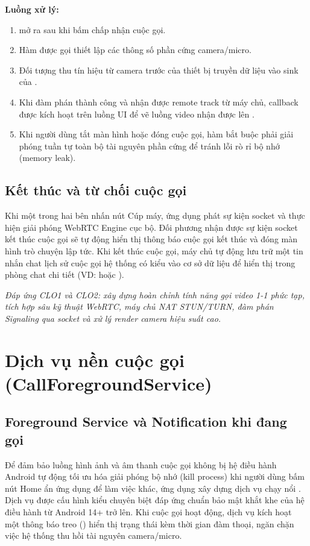 \textbf{Luồng xử lý:}
\begin{enumerate}
    \item {} mở ra sau khi bấm chấp nhận cuộc gọi.
    \item Hàm  được gọi thiết lập các thông số phần cứng camera/micro.
    \item Đối tượng  thu tín hiệu từ camera trước của thiết bị truyền dữ liệu vào sink của .
    \item Khi đàm phán thành công và nhận được remote track từ máy chủ, callback  được kích hoạt trên luồng UI để vẽ luồng video nhận được lên .
    \item Khi người dùng tắt màn hình hoặc đóng cuộc gọi, hàm  bắt buộc phải giải phóng tuần tự toàn bộ tài nguyên phần cứng để tránh lỗi rò rỉ bộ nhớ (memory leak).
\end{enumerate}

\subsection{Kết thúc và từ chối cuộc gọi}
Khi một trong hai bên nhấn nút Cúp máy, ứng dụng phát sự kiện socket  và thực hiện giải phóng WebRTC Engine cục bộ.
Đối phương nhận được sự kiện socket kết thúc cuộc gọi sẽ tự động hiển thị thông báo cuộc gọi kết thúc và đóng màn hình trò chuyện lập tức. Khi kết thúc cuộc gọi, máy chủ tự động lưu trữ một tin nhắn chat lịch sử cuộc gọi hệ thống có kiểu  vào cơ sở dữ liệu để hiển thị trong phòng chat chi tiết (VD:  hoặc ).

\textit{Đáp ứng CLO1 và CLO2: xây dựng hoàn chỉnh tính năng gọi video 1-1 phức tạp, tích hợp sâu kỹ thuật WebRTC, máy chủ NAT STUN/TURN, đàm phán Signaling qua socket và xử lý render camera hiệu suất cao.}


\section{Dịch vụ nền cuộc gọi (CallForegroundService)}

\subsection{Foreground Service và Notification khi đang gọi}
Để đảm bảo luồng hình ảnh và âm thanh cuộc gọi không bị hệ điều hành Android tự động tối ưu hóa giải phóng bộ nhớ (kill process) khi người dùng bấm nút Home ẩn ứng dụng để làm việc khác, ứng dụng xây dựng dịch vụ chạy nổi .
Dịch vụ được cấu hình kiểu chuyên biệt  đáp ứng chuẩn bảo mật khắt khe của hệ điều hành từ Android 14+ trở lên. Khi cuộc gọi hoạt động, dịch vụ kích hoạt một thông báo treo () hiển thị trạng thái  kèm thời gian đàm thoại, ngăn chặn việc hệ thống thu hồi tài nguyên camera/micro.

